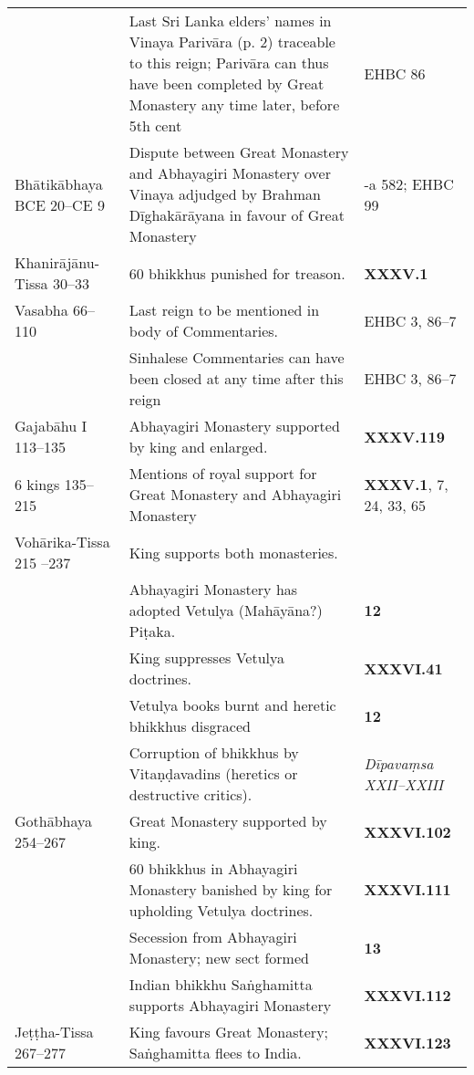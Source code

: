 \begin{tabular}{l|l|l}
     & Last Sri Lanka elders’ names in Vinaya Parivāra (p. 2) traceable to this reign; Parivāra can thus have been completed by Great Monastery any time later, before 5th cent   & EHBC 86\\
    Bhātikābhaya BCE 20–CE 9 & Dispute between Great Monastery and Abhayagiri Monastery over Vinaya adjudged by Brahman Dīghakārāyana in favour of Great Monastery  & \textbf{\cite{Vin}}-a 582; EHBC 99 \\
    Khanirājānu-Tissa 30–33 & 60 bhikkhus punished for treason. & \textbf{\cite{Mhv} XXXV.1}\\
    Vasabha  66–110   & Last reign to be mentioned in body of Commentaries.   & EHBC 3, 86–7 \\
     & Sinhalese Commentaries can have been closed at any time after this reign & EHBC 3, 86–7 \\
    Gajabāhu I  113–135   & Abhayagiri Monastery supported by king and enlarged.  & \textbf{\cite{Mhv} XXXV.119} \\
    6 kings  135–215   & Mentions of royal support for Great Monastery and Abhayagiri Monastery & \textbf{\cite{Mhv} XXXV.1}, 7, 24, 33, 65 \\
    Vohārika-Tissa 215 –237  & King supports both monasteries.  & \\
     & Abhayagiri Monastery has adopted Vetulya (Mahāyāna?) Piṭaka. & \textbf{\cite{Nikāya-s} 12}\\
     & King suppresses Vetulya doctrines. & \textbf{\cite{Mhv} XXXVI.41}\\
     & Vetulya books burnt and heretic bhikkhus disgraced   & \textbf{\cite{Nikāya-s} 12} \\
     & Corruption of bhikkhus by Vitaṇḍavadins (heretics or destructive critics).  & \emph{Dīpavaṃsa XXII–XXIII}\\
    Gothābhaya 254–267 & Great Monastery supported by king.  & \textbf{\cite{Mhv} XXXVI.102} \\
     & 60 bhikkhus in Abhayagiri Monastery banished by king for upholding Vetulya doctrines. & \textbf{\cite{Mhv} XXXVI.111}\\
     & Secession from Abhayagiri Monastery; new sect formed & \textbf{\cite{Nikāya-s} 13}\\
     & Indian bhikkhu Saṅghamitta supports Abhayagiri Monastery & \textbf{\cite{Mhv} XXXVI.112}\\
    Jeṭṭha-Tissa 267–277 & King favours Great Monastery; Saṅghamitta flees to India.  & \textbf{\cite{Mhv} XXXVI.123}  \\

\end{tabular}

